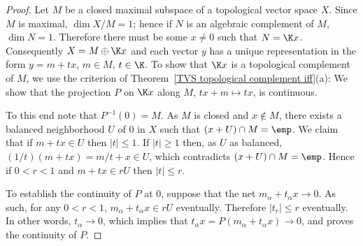 \begin{proof}
Let $M$ be a closed maximal subspace of a topological vector space $X$. Since $M$ is maximal, $\dim X/M=1$; hence if $N$ is an algebraic complement of $M$, $\dim N=1$. Therefore there must be some $x\neq 0$ such that $N=\K x$. Consequently $X=M\oplus\K x$ and each vector $y$ has a unique representation in the form $y=m+tx$, $m\in M$, $t\in\K$. To show that $\K x$ is a topological complement of $M$, we use the criterion of Theorem~\ref{TVS topological complement iff}(a): We show that the projection $P$ on $\K x$ along $M$, $tx+m\mapsto tx$, is continuous.\par
To this end note that $P^{-1}(0)=M$. As $M$ is closed and $x\notin M$, there exists a balanced neighborhood $U$ of $0$ in $X$ such that $(x+U)\cap M=\emp$. We claim that if $m+tx\in U$ then $|t|\leq 1$. If $|t|\geq 1$ then, as $U$ as balanced, $(1/t)(m+tx)=m/t+x\in U$, which contradicts $(x+U)\cap M=\emp$. Hence if $0<r<1$ and $m+tx\in rU$ then $|t|\leq r$.\par
To establish the continuity of $P$ at $0$, suppose that the net $m_\alpha+t_\alpha x\to 0$. As such, for any $0<r<1$, $m_\alpha+t_\alpha x\in rU$ eventually. Therefore $|t_r|\leq r$ eventually. In other words, $t_\alpha\to 0$, which implies that $t_\alpha x=P(m_\alpha+t_\alpha x)\to 0$, and proves the continuity of $P$.
\end{proof}

